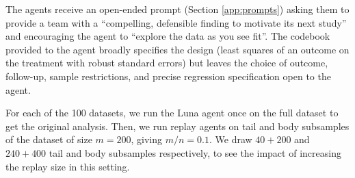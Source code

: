 \documentclass[10pt]{article}
\begin{document}
The agents receive an open-ended prompt (Section \ref{app:prompts}) asking them to provide a team with a ``compelling, defensible finding to motivate its next study'' and encouraging the agent to ``explore the data as you see fit''. The codebook provided to the agent broadly specifies the design (least squares of an outcome on the treatment with robust standard errors) but leaves the choice of outcome, follow-up, sample restrictions, and precise regression specification open to the agent.

For each of the 100 datasets, we run the Luna agent once on the full dataset to get the original analysis. Then, we run replay agents on tail and body subsamples of the dataset of size $m=200$, giving $m/n=0.1$. We draw $40+200$ and $240+400$ tail and body subsamples respectively, to see the impact of increasing the replay size in this setting.
\end{document}
